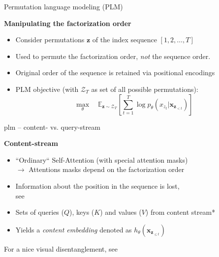 \documentclass[11pt,compress,t,notes=noshow, xcolor=table]{beamer}
\begin{document}

\begin{frame}{Permutation language modeling (PLM)}

\vfill
	
	\textbf{Manipulating the factorization order}
	
	\begin{itemize}
		\item Consider permutations $\mathbf{z}$ of the index sequence $[1,2, \hdots, T]$
		\item[$\to$] Used to permute the factorization order, \textit{not} the sequence order.
		\item Original order of the sequence is retained via positional encodings
		\item PLM objective (with $\mathcal{Z}_T$ as set of all possible permutations):
					$$\max_{\theta} \quad \mathds{E}_{\mathbf{z}\sim\mathcal{Z}_T} \left[ \sum_{t=1}^{T} \log p_\theta (x_{z_t} | \mathbf{x}_{\mathbf{z}_{< t}}) \right]$$
	\end{itemize}
	
\vfill

\end{frame}


\begin{frame}{plm -- content- vs. query-stream}

\vfill

	\textbf{Content-stream}
	
	\begin{itemize}
		\item ``Ordinary`` Self-Attention (with special attention masks)\\
					$\rightarrow$ Attentions masks depend on the factorization order
		\item Information about the position in the sequence is lost,\\
					see 
		\item Sets of queries ($Q$), keys ($K$) and values ($V$) from content stream*
		\item Yields a \textit{content embedding} denoted as $h_{\theta}(\mathbf{x}_{\mathbf{z}_{\leq t}})$
	\end{itemize}
	
\vfill

	{\footnotesize *For a nice visual disentanglement, see }
	
\end{frame}
\end{document}
